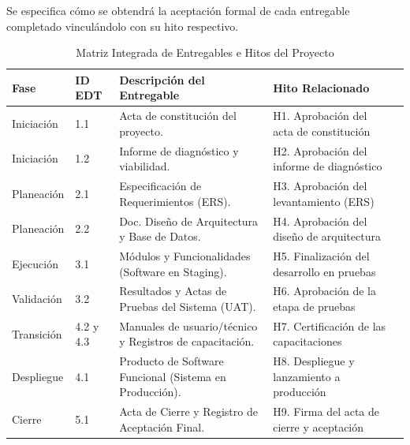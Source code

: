 Se especifica cómo se obtendrá la aceptación formal de cada entregable completado vinculándolo con su hito respectivo.

\begin{table}[H]
\footnotesize
\centering
\begin{tabulary}{\textwidth}{@{}LLLLL@{}}
\toprule
\textbf{Fase} & \textbf{ID EDT} & \textbf{Descripción del Entregable} & \textbf{Hito Relacionado} \\ \midrule
Iniciación & 1.1 & Acta de constitución del proyecto. & H1. Aprobación del acta de constitución \\ 
Iniciación & 1.2 & Informe de diagnóstico y viabilidad. & H2. Aprobación del informe de diagnóstico \\
Planeación & 2.1 & Especificación de Requerimientos (ERS). & H3. Aprobación del levantamiento (ERS) \\
Planeación & 2.2 & Doc. Diseño de Arquitectura y Base de Datos. & H4. Aprobación del diseño de arquitectura \\
Ejecución & 3.1 & Módulos y Funcionalidades (Software en Staging). & H5. Finalización del desarrollo en pruebas \\
Validación & 3.2 & Resultados y Actas de Pruebas del Sistema (UAT). & H6. Aprobación de la etapa de pruebas \\
Transición & 4.2 y 4.3 & Manuales de usuario/técnico y Registros de capacitación. & H7. Certificación de las capacitaciones \\
Despliegue & 4.1 & Producto de Software Funcional (Sistema en Producción). & H8. Despliegue y lanzamiento a producción \\
Cierre     & 5.1 & Acta de Cierre y Registro de Aceptación Final. & H9. Firma del acta de cierre y aceptación \\ \bottomrule
\end{tabulary}
\caption{Matriz Integrada de Entregables e Hitos del Proyecto}
\end{table}
